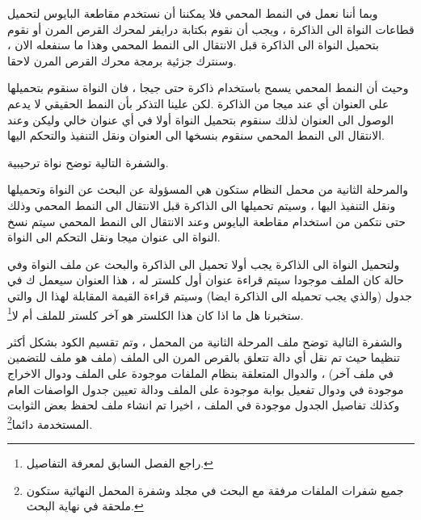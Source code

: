 \documentclass[document.tex]{subfiles}
\begin{document}
وبما أننا نعمل في النمط المحمي  فلا يمكننا أن نستخدم مقاطعة البايوس  لتحميل قطاعات النواة الى الذاكرة ، ويجب أن نقوم بكتابة درايفر لمحرك القرص المرن أو نقوم بتحميل النواة الى الذاكرة قبل الانتقال الى النمط المحمي وهذا ما سنفعله الان ، وسنترك جزئية برمجة محرك القرص المرن لاحقا.

وحيث أن النمط المحمي يسمح باستخدام ذاكرة حتى  جيجا ، فان النواة سنقوم بتحميلها على العنوان  أي عند  ميجا من الذاكرة .لكن علينا التذكر بأن النمط الحقيقي لا يدعم الوصول الى العنوان  لذلك سنقوم بتحميل النواة أولا في أي عنوان خالي وليكن  وعند الانتقال الى النمط المحمي سنقوم بنسخها الى العنوان  ونقل التنفيذ والتحكم اليها.

والشفرة التالية توضح نواة ترحيبية.

\begin{english}
\lstset{numberstyle=\tiny,numbersep=5pt,tabsize=2,extendedchars=true,breaklines=true,frame=b,showspaces=false, showtabs=false,xleftmargin=10pt,framexleftmargin=10pt,framexrightmargin=5pt,framexbottommargin=4pt,showstringspaces=false,language=[x86masm]Assembler}


\end{english}

والمرحلة الثانية من محمل النظام ستكون هي المسؤولة عن البحث عن النواة وتحميلها ونقل التنفيذ اليها ، وسيتم تحميلها الى الذاكرة قبل الانتقال الى النمط المحمي وذلك حتى نتكمن من استخدام مقاطعة البايوس  وعند الانتقال الى النمط المحمي سيتم نسخ النواة الى عنوان  ميجا ونقل التحكم الى النواة.

ولتحميل النواة الى الذاكرة يجب أولا تحميل  الى الذاكرة والبحث عن ملف النواة وفي حالة كان الملف موجودا سيتم قراءة عنوان أول كلستر له ، هذا العنوان سيعمل ك  في جدول  (والذي يجب تحميله الى الذاكرة ايضا) وسيتم قراءة القيمة المقابلة لهذا ال  والتي ستخبرنا هل ما اذا كان هذا الكلستر هو آخر كلستر للملف أم لا\footnote{راجع الفصل السابق لمعرفة التفاصيل.}.

والشفرة التالية توضح ملف المرحلة الثانية من المحمل  ، وتم تقسيم الكود بشكل أكثر تنظيما حيث تم نقل أي دالة تتعلق بالقرص المرن الى الملف  (ملف  هو ملف للتضمين في ملف آخر) ، والدوال المتعلقة بنظام الملفات موجودة على الملف  ودوال الاخراج موجودة في  ودوال تفعيل بوابة  موجودة على الملف  ودالة تعيين جدول الواصفات العام وكذلك تفاصيل الجدول موجودة في الملف  ، اخيرا تم انشاء ملف  لحفظ بعض الثوابت المستخدمة دائما\footnote{جميع شفرات الملفات مرفقة مع البحث في مجلد  وشفرة المحمل النهائية ستكون ملحقة في نهاية البحث.}.
\end{document}
